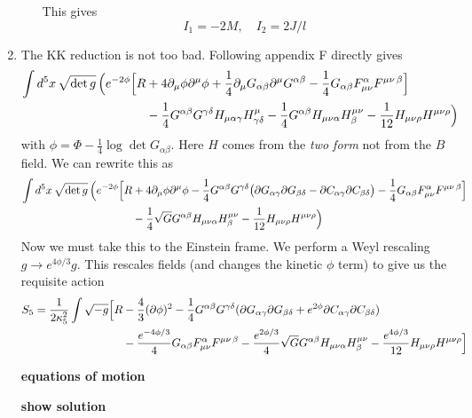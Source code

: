 \documentclass[11pt, class=article, crop=false]{standalone}
\begin{document}
\begin{enumerate}
\begin{enumerate}
		This gives 
		\[
			I_1 = -2 M, \quad  I_2 = 2 J / l
		\]
	\end{enumerate}
	
	\item The KK reduction is not too bad. Following appendix F directly gives
	\[
	\begin{aligned}
		\int d^5 x \, \sqrt{\det g} \, \Big(e^{-2\phi} \Big[R &+ 4 \partial_\mu \phi \partial^\mu \phi + \frac14 \partial_\mu G_{\alpha \beta} \partial^\mu G^{\alpha \beta} - \frac14  G_{\alpha \beta} F_{\mu \nu}^\alpha F^{\mu \nu\, \beta} \Big] \\
		& - \frac14 G^{\alpha \beta} G^{\gamma \delta} H_{\mu \alpha \gamma} H^\mu_{\gamma \delta} - \frac14 G^{\alpha \beta} H_{\mu \nu \alpha} H^{\mu \nu}_\beta - \frac{1}{12} H_{\mu \nu \rho} H^{\mu \nu \rho}  \Big)
	\end{aligned}
	\]
	with $\phi = \Phi - \frac14 \log \det G_{\alpha \beta}$.
	Here $H$ comes from the \emph{two form} not from the $B$ field. We can rewrite this as
	\[
	\begin{aligned}
			\int d^5 x \, \sqrt{\det g} \, \Big(e^{-2\phi} \Big[R &+ 4 \partial_\mu \phi \partial^\mu \phi - \frac14 G^{\alpha \beta} G^{\gamma \delta} \big(  \partial G_{\alpha \gamma} \partial G_{\beta \delta} - \partial C_{\alpha \gamma} \partial C_{\beta \delta}  \big) -  \frac14  G_{\alpha \beta} F_{\mu \nu}^\alpha F^{\mu \nu\, \beta} \Big] \\
			& - \frac14 \sqrt{G} G^{\alpha \beta} H_{\mu \nu \alpha} H^{\mu \nu}_\beta - \frac{1}{12} H_{\mu \nu \rho} H^{\mu \nu \rho}  \Big)
		\end{aligned}
	\]
	Now we must take this to the Einstein frame. We perform a Weyl rescaling $g \to e^{4\phi/3} g$. This rescales fields (and changes the kinetic $\phi$ term) to give us the requisite action
	\[
	\begin{aligned}
		S_5 = \frac{1}{2 \kappa_5^2} \int \sqrt{-g} \Big[R &- \frac43 (\partial \phi)^2 - \frac14 G^{\alpha \beta} G^{\gamma \delta} (\partial G_{\alpha \gamma} \partial G_{\beta \delta} + e^{2\phi} \partial C_{\alpha \gamma} \partial C_{\beta \delta})\\
		& - \frac{e^{-4 \phi/3}}{4} G_{\alpha \beta} F_{\mu \nu}^\alpha F^{\mu \nu\, \beta} - \frac{e^{2\phi /3}}{4} \sqrt{G} G^{\alpha \beta} H_{\mu \nu \alpha} H^{\mu \nu}_\beta - \frac{e^{4 \phi/3}}{12} H_{\mu \nu \rho} H^{\mu \nu \rho}  \Big]
	\end{aligned}
	\]
	
	\textbf{equations of motion}
	
	\textbf{show solution}
	

\end{enumerate}
\end{document}
